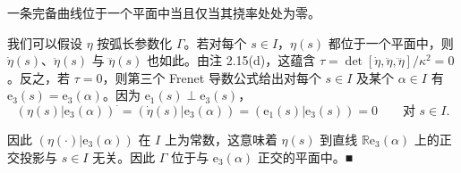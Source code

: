 \begin{proposition}

一条完备曲线位于一个平面中当且仅当其挠率处处为零。

\proofhead
我们可以假设 $ \eta $ 按弧长参数化 $ \Gamma $。若对每个 $ s \in I $，$ \eta(s) $ 都位于一个平面中，则 $ \dot{\eta}(s) $、$ \ddot{\eta}(s) $ 与 $ \dddot{\eta}(s) $ 也如此。由注 2.15(d)，这蕴含 $ \tau = \det[\dot{\eta}, \ddot{\eta}, \dddot{\eta}]/\kappa^{2} = 0 $。反之，若 $ \tau = 0 $，则第三个 Frenet 导数公式给出对每个 $ s \in I $ 及某个 $ \alpha \in I $ 有 $ \mathrm{e}_{3}(s) = \mathrm{e}_{3}(\alpha) $。因为 $ \mathrm{e}_{1}(s) \perp \mathrm{e}_{3}(s) $，
\[
\left(\eta(s)|\mathrm{e}_{3}(\alpha)\right)^{\cdot} = (\dot{\eta}(s)|\mathrm{e}_{3}(\alpha)) = (\mathrm{e}_{1}(s)|\mathrm{e}_{3}(s)) = 0 \qquad \text{对 } s \in I .
\]

因此 $ (\eta(\cdot)|\mathrm{e}_{3}(\alpha)) $ 在 $ I $ 上为常数，这意味着 $ \eta(s) $ 到直线 $ \mathbb{R}\mathrm{e}_{3}(\alpha) $ 上的正交投影与 $ s \in I $ 无关。因此 $ \Gamma $ 位于与 $ \mathrm{e}_{3}(\alpha) $ 正交的平面中。\nobreak\hspace{0.35em}■

\end{proposition}

\exerciseshead

